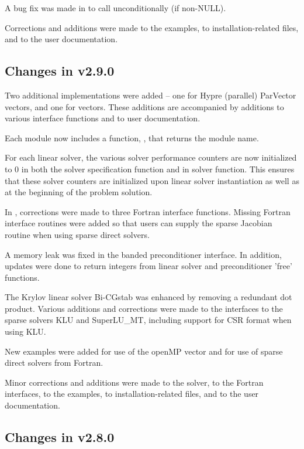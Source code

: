 A bug fix was made in  to call  unconditionally 
(if non-NULL).
 
Corrections and additions were made to the examples, 
to installation-related files,
and to the user documentation.


\subsection*{Changes in v2.9.0}

Two additional {\nvector} implementations were added -- one for
Hypre (parallel) ParVector vectors, and one for {\petsc} vectors.  These
additions are accompanied by additions to various interface functions
and to user documentation.

Each {\nvector} module now includes a function, ,
that returns the {\nvector} module name.

For each linear solver, the various solver performance counters are
now initialized to 0 in both the solver specification function and in
solver  function.  This ensures that these solver counters
are initialized upon linear solver instantiation as well as at the
beginning of the problem solution.

In {\fcvode}, corrections were made to three Fortran interface
functions.  Missing Fortran interface routines were added so that 
users can supply the sparse Jacobian routine when using sparse direct 
solvers.

A memory leak was fixed in the banded preconditioner interface.
In addition, updates were done to return integers from linear solver 
and preconditioner 'free' functions.

The Krylov linear solver Bi-CGstab was enhanced by removing a redundant
dot product.  Various additions and corrections were made to the
interfaces to the sparse solvers KLU and SuperLU\_MT, including support
for CSR format when using KLU.

New examples were added for use of the openMP vector and for use of 
sparse direct solvers from Fortran.

Minor corrections and additions were made to the {\cvode} solver, to the
Fortran interfaces, to the examples, to installation-related files,
and to the user documentation.

\subsection*{Changes in v2.8.0}

